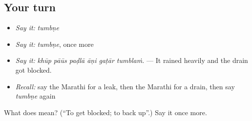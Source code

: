 \subsection*{Your turn}
\begin{itemize}
\raggedright
  \item \emph{Say it:} \emph{tumbṇe}
  \item \emph{Say it:} \emph{tumbṇe}, once more
  \item \emph{Say it:} \emph{khūp pāūs paḍlā āṇi gaṭār tumblaṁ.} — It rained heavily and the drain got blocked.
  \item \emph{Recall:} say the Marathi for a leak, then the Marathi for a drain, then say \emph{tumbṇe} again
\end{itemize}

\begin{tcolorbox}[breakable,colback=teal!4,colframe=teal!35!black,title={Before you move on}]
What does  mean? (\textquotedblleft{}To get blocked; to back up\textquotedblright{}.) Say it once more.
\end{tcolorbox}
